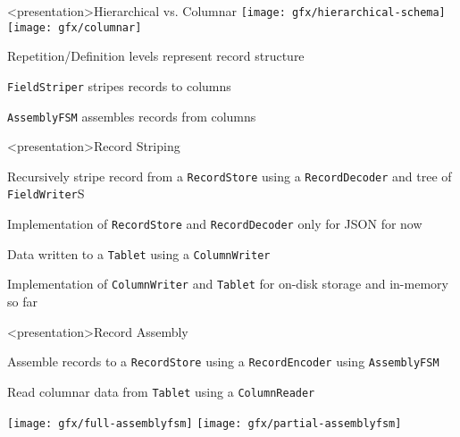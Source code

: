 \begin{frame}<presentation>{Hierarchical vs. Columnar}
\texttt{[image: gfx/hierarchical-schema]}
\hfill
\texttt{[image: gfx/columnar]}

\begin{niitemize}
 \item Repetition/Definition levels represent record structure
 \item \texttt{FieldStriper} stripes records to columns
 \item \texttt{AssemblyFSM} assembles records from columns
\end{niitemize}
\end{frame}

\begin{frame}<presentation>{Record Striping}
\begin{niitemize}
 \item Recursively stripe record from a \texttt{RecordStore} using a
  \texttt{RecordDecoder} and tree of \texttt{FieldWriter}S
 \item Implementation of \texttt{RecordStore} and \texttt{RecordDecoder} only
  for JSON for now
 \item Data written to a \texttt{Tablet} using a \texttt{ColumnWriter}
 \item Implementation of \texttt{ColumnWriter} and \texttt{Tablet} for on-disk
  storage and in-memory so far
\end{niitemize}
\end{frame}

\begin{frame}<presentation>{Record Assembly}
\begin{niitemize}
 \item Assemble records to a \texttt{RecordStore} using a
  \texttt{RecordEncoder} using \texttt{AssemblyFSM}
 \item Read columnar data from \texttt{Tablet} using a \texttt{ColumnReader}
\end{niitemize}

\texttt{[image: gfx/full-assemblyfsm]}
\hfill
\texttt{[image: gfx/partial-assemblyfsm]}
\end{frame}

